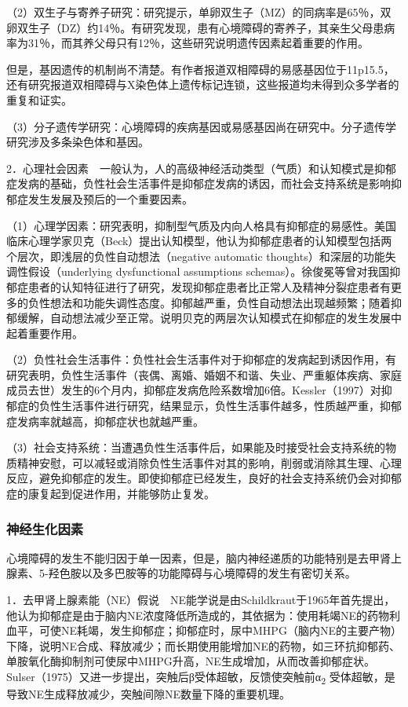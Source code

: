 （2）双生子与寄养子研究：研究提示，单卵双生子（MZ）的同病率是65％，双卵双生子（DZ）约14％。有研究发现，患有心境障碍的寄养子，其亲生父母患病率为31％，而其养父母只有12％，这些研究说明遗传因素起着重要的作用。

但是，基因遗传的机制尚不清楚。有作者报道双相障碍的易感基因位于11p15.5，还有研究报道双相障碍与X染色体上遗传标记连锁，这些报道均未得到众多学者的重复和证实。

（3）分子遗传学研究：心境障碍的疾病基因或易感基因尚在研究中。分子遗传学研究涉及多条染色体和基因。

2．心理社会因素　一般认为，人的高级神经活动类型（气质）和认知模式是抑郁症发病的基础，负性社会生活事件是抑郁症发病的诱因，而社会支持系统是影响抑郁症发生发展及预后的一个重要因素。

（1）心理学因素：研究表明，抑制型气质及内向人格具有抑郁症的易感性。美国临床心理学家贝克（Beck）提出认知模型，他认为抑郁症患者的认知模型包括两个层次，即浅层的负性自动想法（negative
automatic thoughts）和深层的功能失调性假设（underlying dysfunctional
assumptions
schemas）。徐俊冕等曾对我国抑郁症患者的认知特征进行了研究，发现抑郁症患者比正常人及精神分裂症患者有更多的负性想法和功能失调性态度。抑郁越严重，负性自动想法出现越频繁；随着抑郁缓解，自动想法减少至正常。说明贝克的两层次认知模式在抑郁症的发生发展中起着重要作用。

（2）负性社会生活事件：负性社会生活事件对于抑郁症的发病起到诱因作用，有研究表明，负性生活事件（丧偶、离婚、婚姻不和谐、失业、严重躯体疾病、家庭成员去世）发生的6个月内，抑郁症发病危险系数增加6倍。Kessler（1997）对抑郁症的负性生活事件进行研究，结果显示，负性生活事件越多，性质越严重，抑郁症发病率就越高，抑郁症状也就越严重。

（3）社会支持系统：当遭遇负性生活事件后，如果能及时接受社会支持系统的物质精神安慰，可以减轻或消除负性生活事件对其的影响，削弱或消除其生理、心理反应，避免抑郁症的发生。即使抑郁症已经发生，良好的社会支持系统仍会对抑郁症的康复起到促进作用，并能够防止复发。

\subsubsection{神经生化因素}

心境障碍的发生不能归因于单一因素，但是，脑内神经递质的功能特别是去甲肾上腺素、5-羟色胺以及多巴胺等的功能障碍与心境障碍的发生有密切关系。

1．去甲肾上腺素能（NE）假说　NE能学说是由Schildkraut于1965年首先提出，他认为抑郁症是由于脑内NE浓度降低所造成的，其依据为：使用耗竭NE的药物利血平，可使NE耗竭，发生抑郁症；抑郁症时，尿中MHPG（脑内NE的主要产物）下降，说明NE合成、释放减少；而长期使用能增加NE的药物，如三环抗抑郁药、单胺氧化酶抑制剂可使尿中MHPG升高，NE生成增加，从而改善抑郁症状。Sulser（1975）又进一步提出，突触后β受体超敏，反馈使突触前α\textsubscript{2}
受体超敏，是导致NE生成释放减少，突触间隙NE数量下降的重要机理。

